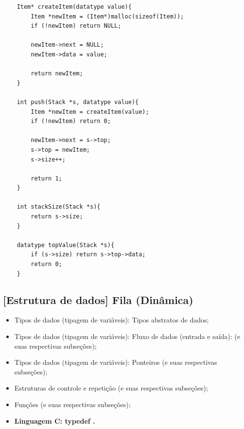 \documentclass[12pt]{article}
\begin{document}
\begin{lstlisting}
    Item* createItem(datatype value){
    	Item *newItem = (Item*)malloc(sizeof(Item));
    	if (!newItem) return NULL;
    	
    	newItem->next = NULL;
    	newItem->data = value;
    	
    	return newItem;
    }
    
    int push(Stack *s, datatype value){
    	Item *newItem = createItem(value);
    	if (!newItem) return 0;
    	
    	newItem->next = s->top;
    	s->top = newItem;
    	s->size++;
    	
    	return 1;
    }
    
    int stackSize(Stack *s){
    	return s->size;
    }
    
    datatype topValue(Stack *s){
    	if (s->size) return s->top->data;
    	return 0;
    }
\end{lstlisting}

\newpage
\subsection{[Estrutura de dados] Fila (Dinâmica)}

\hspace{0.25cm}
\begin{tcolorbox}[colback=violet!5!white,colframe=violet!75!white,title=Capítulos recomendados:]
    \begin{itemize}
        \item Tipos de dados (tipagem de variáveis): Tipos abstratos de dados;
        \item Tipos de dados (tipagem de variáveis): Fluxo de dados (entrada e saída): (e suas respectivas subseções);
        \item Tipos de dados (tipagem de variáveis): Ponteiros (e suas respectivas subseções);
        \item Estruturas de controle e repetição (e suas respectivas subseções);
        \item Funções (e suas respectivas subseções);
        \item \textbf{Linguagem C: typedef \cite{site:typedef}.}
    \end{itemize}
\end{tcolorbox}
\end{document}
